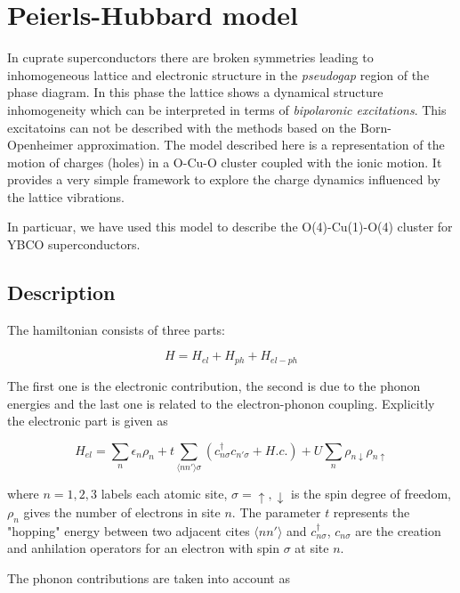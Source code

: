 \chapter{Peierls-Hubbard model}

In cuprate superconductors there are broken symmetries leading to inhomogeneous lattice and electronic structure in the \textit{pseudogap} region of the phase diagram. In this phase the lattice shows a dynamical structure inhomogeneity which can be interpreted in terms of \textit{bipolaronic excitations}. This excitatoins can not be described with the methods based on the Born-Openheimer approximation. The model described here is a representation of the motion of charges (holes) in a O-Cu-O cluster coupled with the ionic motion. It provides a very simple framework to explore the charge dynamics influenced by the lattice vibrations.

In particuar, we have used this model to describe the O(4)-Cu(1)-O(4) cluster for YBCO superconductors.


\section{Description}

The hamiltonian consists of three parts\cite{Salkola1994}:

\begin{equation}\label{full-hamiltonian}H = H_{el} + H_{ph} + H_{el-ph}\end{equation}

The first one is the electronic contribution, the second is due to the phonon energies and the last one is related to the electron-phonon coupling. Explicitly the electronic part is given as

\begin{equation}\label{electronic-part}H_{el} = \sum_n \epsilon_n \rho_n + t\sum_{\langle nn'\rangle\sigma}(c_{n\sigma}^\dagger c_{n'\sigma} + H.c.) + U\sum_n \rho_{n\downarrow}\rho_{n\uparrow}\end{equation}

where $n=1,2,3$ labels each atomic site, $\sigma=\uparrow,\downarrow$ is the spin degree of freedom, $\rho_n$ gives the number of electrons in site $n$. The parameter $t$ represents the "hopping" energy between two adjacent cites $\langle n n'\rangle$ and $c^\dagger_{n\sigma}$, $c_{n\sigma}$ are the creation and anhilation operators for an electron with spin $\sigma$ at site $n$.

The phonon contributions are taken into account as

